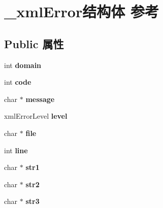 \hypertarget{struct__xml_error}{}\section{\+\_\+xml\+Error结构体 参考}
\label{struct__xml_error}
\subsection*{Public 属性}
\begin{DoxyCompactItemize}
\item 
\mbox{\label{struct__xml_error_aab2c2106653999b10a5927fbef170134}} 
int {\bfseries domain}
\item 
\mbox{\label{struct__xml_error_a26d37a9627e5767d10642f7575b456cb}} 
int {\bfseries code}
\item 
\mbox{\label{struct__xml_error_aec639995a12899bed05700cf2e12d878}} 
char $\ast$ {\bfseries message}
\item 
\mbox{\label{struct__xml_error_a51d46e073d52e80e09c1968833549dcc}} 
xml\+Error\+Level {\bfseries level}
\item 
\mbox{\label{struct__xml_error_a26ea8c72d8741e89ae7f7aecf21e3b90}} 
char $\ast$ {\bfseries file}
\item 
\mbox{\label{struct__xml_error_af25357d13a171f2eeed7b74297d21eb1}} 
int {\bfseries line}
\item 
\mbox{\label{struct__xml_error_a910ea2be7690e0096b321f0b415aad92}} 
char $\ast$ {\bfseries str1}
\item 
\mbox{\label{struct__xml_error_ac30b76c554a115afd536016a2867143b}} 
char $\ast$ {\bfseries str2}
\item 
\mbox{\label{struct__xml_error_a8e7da080c0eacf285355e730f00bbf7b}} 
char $\ast$ {\bfseries str3}
\item 
\mbox{\label{struct__xml_error_a6f9278bc2b797ad7f6a92b765aead611}} 

\end{DoxyCompactItemize}
